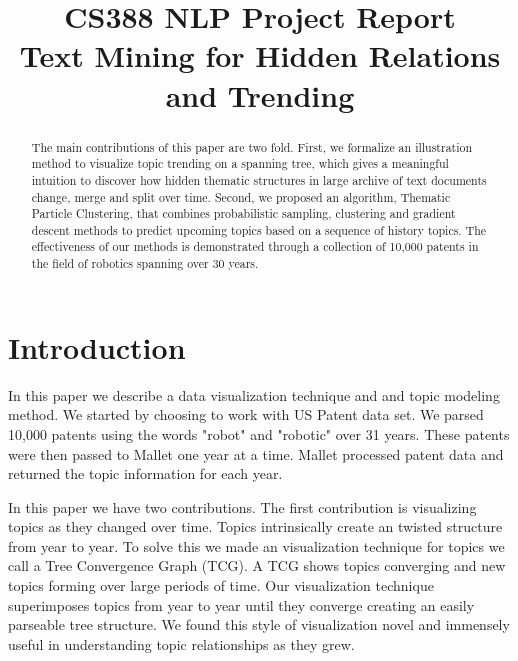 \documentclass[conference]{IEEEtran}
\begin{document}
\title{\large{CS388 NLP Project Report}\\ \huge{Text Mining for Hidden Relations and Trending}}

\author{
\and
{}
}
\maketitle
\onehalfspace
\begin{abstract}
The main contributions of this paper are two fold. First, we formalize an illustration method to visualize topic trending on a spanning tree, which gives a meaningful intuition to discover how hidden thematic structures in large archive of text documents change, merge and split over time. Second, we proposed an algorithm, Thematic Particle Clustering, that combines probabilistic sampling, clustering and gradient descent methods to predict upcoming topics based on a sequence of history topics. The effectiveness of our methods is demonstrated through a collection of 10,000 patents in the field of robotics spanning over 30 years.
\end{abstract}

\section{Introduction}
In this paper we describe a data visualization technique and and topic modeling method. We started by choosing to work with US Patent data set. We parsed 10,000 patents using the words "robot" and "robotic" over 31 years. These patents were then passed to Mallet \cite{mallet} one year at a time. Mallet processed patent data and returned the topic information for each year.

In this paper we have two contributions. The first contribution is visualizing topics as they changed over time. Topics intrinsically create an twisted structure from year to year. To solve this we made an visualization technique for topics we call a Tree Convergence Graph (TCG). A TCG shows topics converging and new topics forming over large periods of time. Our visualization technique superimposes topics from year to year until they converge creating an easily parseable tree structure. We found this style of visualization novel and immensely useful in understanding topic relationships as they grew. 
\end{document}
